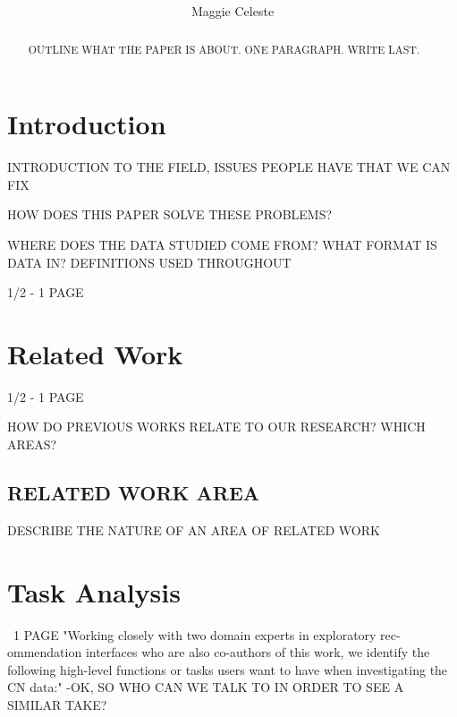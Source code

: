 \documentclass[letterpaper,twocolumn,fleqn]{article}
\title{ }
\author{Maggie Celeste
}
\date{} %
\begin{document}
 

\maketitle 

\thispagestyle{empty} %


\begin{abstract}
OUTLINE WHAT THE PAPER IS ABOUT. ONE PARAGRAPH. WRITE LAST.
\end{abstract}
\section{Introduction}
\label{sec:intro}

INTRODUCTION TO THE FIELD, ISSUES PEOPLE HAVE THAT WE CAN FIX

HOW DOES THIS PAPER SOLVE THESE PROBLEMS?

WHERE DOES THE DATA STUDIED COME FROM? WHAT FORMAT IS DATA IN? DEFINITIONS USED THROUGHOUT

1/2 - 1 PAGE

\section{Related Work}
1/2 - 1 PAGE
\label{sec:related}

HOW DO PREVIOUS WORKS RELATE TO OUR RESEARCH? WHICH AREAS?

\subsection{RELATED WORK AREA}

DESCRIBE THE NATURE OF AN AREA OF RELATED WORK

\section{Task Analysis}
~1 PAGE
"Working closely with two domain experts in exploratory rec-
ommendation interfaces who are also co-authors of this work, we
identify the following high-level functions or tasks users want to
have when investigating the CN data:"
-OK, SO WHO CAN WE TALK TO IN ORDER TO SEE A SIMILAR TAKE?
\label{sec:ta}
\end{document}
